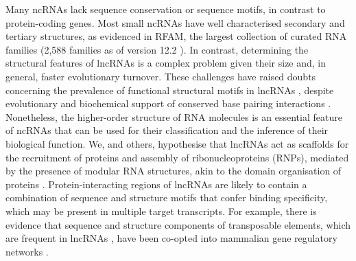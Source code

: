 \documentclass{bmcart}
\begin{document}
Many ncRNAs lack sequence conservation or sequence motifs, in contrast to protein-coding genes.
Most small ncRNAs have well characterised secondary and tertiary structures, as
evidenced in RFAM, the largest collection of curated RNA families (2,588
families as of version 12.2 \cite{rfam12}). In contrast, determining the
structural features of lncRNAs is a complex problem given their size and, in
general, faster evolutionary turnover. These challenges have raised doubts
concerning the prevalence of functional structural  motifs in lncRNAs
\cite{eddy2014computational,rivas2016statistical}, despite evolutionary and
biochemical support of conserved base pairing interactions
\cite{smith2013widespread,spitale2015structural,lu2016rna}.
Nonetheless, the higher-order structure of RNA molecules is an essential feature 
of ncRNAs that can be used for their classification and the inference of their biological function. 
We, and others, hypothesise that lncRNAs act as scaffolds for the recruitment of proteins and assembly of
ribonucleoproteins (RNPs), mediated by the presence of modular RNA structures,
akin to the domain organisation of proteins
\cite{zappulla2006rna,hogg2008structured,rinn2012genome,mercer2013structure,smith2013widespread,chujo2016architectural,blythe2016ins}.
Protein-interacting regions of lncRNAs are likely to contain a combination of
sequence and structure motifs that confer binding specificity, which may 
be present in multiple target transcripts. For example, there is evidence that 
sequence and structure components of transposable elements, 
which are frequent in lncRNAs \cite{kapusta2013transposable,hezroni2015principles}, 
have been co-opted into mammalian gene regulatory networks \cite{kunarso2010transposable,kelley2012transposable}. \\
\end{document}
